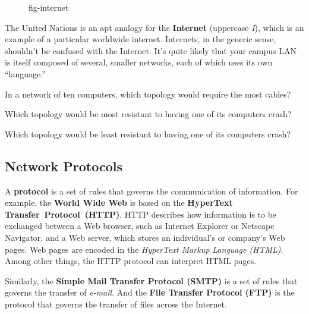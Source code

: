 \begin{figure}[thb]
 {fig-internet}
\end{figure}


The United Nations is an apt analogy for the {\bf Internet}
(uppercase {\it I}), which is an example of a  particular  worldwide
internet.  Internets, in the generic sense, shouldn't be confused
with the Internet.   It's quite likely that your campus LAN is
itself composed of several, smaller networks, each of
which uses its own ``language.''

\pagebreak
{}
\label{self-study-exercises}
\begin{SSTUDY}
\item  In a network of ten computers, which topology would require the
most cables?

\item  Which topology would be most resistant to having one of
its computers crash?

\item  Which topology would be least resistant to having one of
its computers crash?
\end{SSTUDY}


\subsection{Network Protocols}
\noindent A {\bf protocol} is a set of rules that governs the communication of
information.  For example, the {\bf World Wide Web }is based on the {\bf
HyperText} \mbox{\bf Transfer Protocol (HTTP)}. HTTP describes how information is
to be exchanged between a Web browser, such as Internet Explorer or
Netscape Navigator, and a Web server, which stores an individual's or
company's Web pages.  Web pages are encoded in the {\it HyperText
Markup Language (HTML)}. Among other things, the HTTP protocol can
interpret HTML pages.

Similarly, the {\bf Simple Mail Transfer Protocol (SMTP)} is a set of
rules that governs the transfer of {\it e-mail}. And the {\bf File
Transfer Protocol (FTP)} is the protocol that governs the transfer of
files across the Internet.

